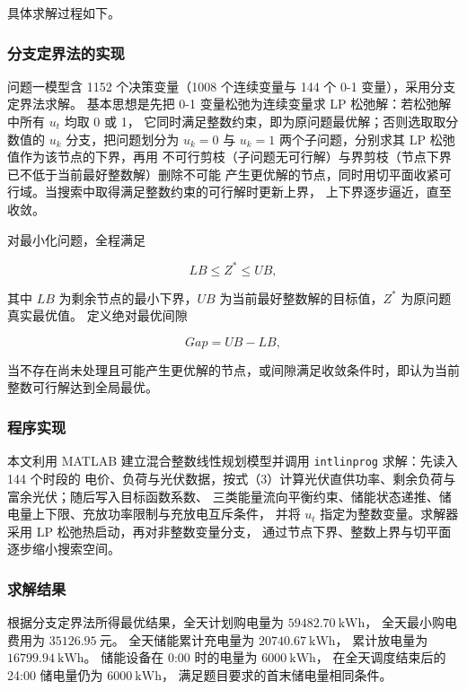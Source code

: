 具体求解过程如下。

\subsubsection{分支定界法的实现}

问题一模型含 1152 个决策变量（1008 个连续变量与 144 个 0-1 变量），采用分支定界法求解。
基本思想是先把 0-1 变量松弛为连续变量求 LP 松弛解：若松弛解中所有 \(u_t\) 均取 0 或 1，
它同时满足整数约束，即为原问题最优解；否则选取取分数值的 \(u_k\) 分支，把问题划分为
\(u_k=0\) 与 \(u_k=1\) 两个子问题，分别求其 LP 松弛值作为该节点的下界，再用
不可行剪枝（子问题无可行解）与界剪枝（节点下界已不低于当前最好整数解）删除不可能
产生更优解的节点，同时用切平面收紧可行域。当搜索中取得满足整数约束的可行解时更新上界，
上下界逐步逼近，直至收敛。

对最小化问题，全程满足

\[
LB\leq Z^*\leq UB,
\]

其中 \(LB\) 为剩余节点的最小下界，\(UB\) 为当前最好整数解的目标值，\(Z^*\) 为原问题真实最优值。
定义绝对最优间隙

\[
Gap=UB-LB,
\]

当不存在尚未处理且可能产生更优解的节点，或间隙满足收敛条件时，即认为当前整数可行解达到全局最优。

\subsubsection{程序实现}

本文利用 MATLAB 建立混合整数线性规划模型并调用 \texttt{intlinprog} 求解：先读入 144 个时段的
电价、负荷与光伏数据，按式（3）计算光伏直供功率、剩余负荷与富余光伏；随后写入目标函数系数、
三类能量流向平衡约束、储能状态递推、储电量上下限、充放功率限制与充放电互斥条件，
并将 \(u_t\) 指定为整数变量。求解器采用 LP 松弛热启动，再对非整数变量分支，
通过节点下界、整数上界与切平面逐步缩小搜索空间。

\subsubsection{求解结果}

根据分支定界法所得最优结果，全天计划购电量为 \(\boxed{59482.70\ \mathrm{kWh}}\)， 全天最小购电费用为 \(\boxed{35126.95\ \mathrm{元}}\)。 全天储能累计充电量为 \(20740.67\ \mathrm{kWh}\)， 累计放电量为 \(16799.94\ \mathrm{kWh}\)。 储能设备在 0:00 时的电量为 \(6000\ \mathrm{kWh}\)， 在全天调度结束后的 24:00 储电量仍为 \(6000\ \mathrm{kWh}\)， 满足题目要求的首末储电量相同条件。

